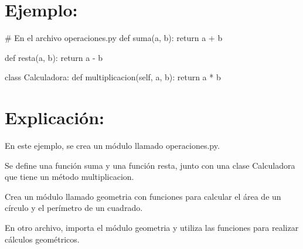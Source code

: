 \documentclass[
  a4paper,
  DIV=11,
  numbers=noendperiod,
  onepage,
  openany]{scrreprt}
\newenvironment{Shaded}{\begin{snugshade}}{\end{snugshade}}
\newcommand{\CommentTok}[1]{\textcolor[rgb]{0.37,0.37,0.37}{#1}}
\newcommand{\ControlFlowTok}[1]{\textcolor[rgb]{0.00,0.23,0.31}{#1}}
\newcommand{\KeywordTok}[1]{\textcolor[rgb]{0.00,0.23,0.31}{#1}}
\newcommand{\NormalTok}[1]{\textcolor[rgb]{0.00,0.23,0.31}{#1}}
\newcommand{\OperatorTok}[1]{\textcolor[rgb]{0.37,0.37,0.37}{#1}}
\newcommand{\VariableTok}[1]{\textcolor[rgb]{0.07,0.07,0.07}{#1}}
\begin{document}
\hypertarget{ejemplo-60}{%
\section{Ejemplo:}\label{ejemplo-60}}

\begin{Shaded}
\begin{Highlighting}[]
\CommentTok{\# En el archivo operaciones.py}
\KeywordTok{def}\NormalTok{ suma(a, b):}
    \ControlFlowTok{return}\NormalTok{ a }\OperatorTok{+}\NormalTok{ b}

\KeywordTok{def}\NormalTok{ resta(a, b):}
    \ControlFlowTok{return}\NormalTok{ a }\OperatorTok{{-}}\NormalTok{ b}

\KeywordTok{class}\NormalTok{ Calculadora:}
    \KeywordTok{def}\NormalTok{ multiplicacion(}\VariableTok{self}\NormalTok{, a, b):}
        \ControlFlowTok{return}\NormalTok{ a }\OperatorTok{*}\NormalTok{ b}
\end{Highlighting}
\end{Shaded}

\hypertarget{explicaciuxf3n-60}{%
\section{Explicación:}\label{explicaciuxf3n-60}}

En este ejemplo, se crea un módulo llamado operaciones.py.

Se define una función suma y una función resta, junto con una clase
Calculadora que tiene un método multiplicacion.

\begin{tcolorbox}[enhanced jigsaw, colbacktitle=quarto-callout-important-color!10!white, toprule=.15mm, leftrule=.75mm, titlerule=0mm, opacityback=0, rightrule=.15mm, opacitybacktitle=0.6, breakable, left=2mm, coltitle=black, title=\textcolor{quarto-callout-important-color}{\faExclamation}\hspace{0.5em}{Actividad Práctica:}, toptitle=1mm, bottomtitle=1mm, arc=.35mm, bottomrule=.15mm, colback=white, colframe=quarto-callout-important-color-frame]

Crea un módulo llamado geometria con funciones para calcular el área de
un círculo y el perímetro de un cuadrado.

En otro archivo, importa el módulo geometria y utiliza las funciones
para realizar cálculos geométricos.

\end{tcolorbox}
\end{document}
